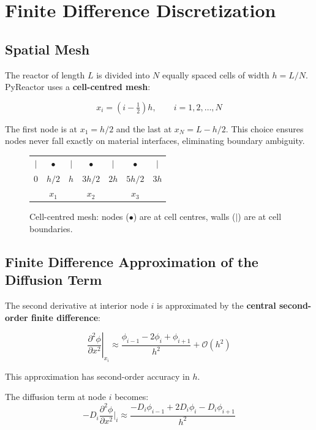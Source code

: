\documentclass[12pt,a4paper]{article}
\newcommand{\pdd}[2]{\frac{\partial^2 #1}{\partial #2^2}}
\begin{document}
\section{Finite Difference Discretization}

\subsection{Spatial Mesh}

The reactor of length $L$ is divided into $N$ equally spaced cells
of width $h = L/N$. PyReactor uses a \textbf{cell-centred mesh}:

\begin{equation}
  x_i = \left(i - \tfrac{1}{2}\right)h, \qquad i = 1, 2, \ldots, N
\end{equation}

The first node is at $x_1 = h/2$ and the last at $x_N = L - h/2$.
This choice ensures nodes never fall exactly on material interfaces,
eliminating boundary ambiguity.

\begin{figure}[h!]
\centering
\begin{tabular}{ccccccc}
  $|$ & $\bullet$ & $|$ & $\bullet$ & $|$ & $\bullet$ & $|$ \\
  $0$ & $h/2$ & $h$ & $3h/2$ & $2h$ & $5h/2$ & $3h$ \\
      & $x_1$ &     & $x_2$ &      & $x_3$  &
\end{tabular}
\caption{Cell-centred mesh: nodes ($\bullet$) are at cell centres,
         walls ($|$) are at cell boundaries.}
\end{figure}

\subsection{Finite Difference Approximation of the Diffusion Term}

The second derivative at interior node $i$ is approximated by the
\textbf{central second-order finite difference}:

\begin{equation}
  \left.\pdd{\phi}{x}\right|_{x_i}
  \approx \frac{\phi_{i-1} - 2\phi_i + \phi_{i+1}}{h^2}
  + \mathcal{O}(h^2)
  \label{eq:fd}
\end{equation}

This approximation has second-order accuracy in $h$.

The diffusion term at node $i$ becomes:
\begin{equation}
  -D_i\pdd{\phi}{x}\bigg|_i
  \approx \frac{-D_i\phi_{i-1} + 2D_i\phi_i - D_i\phi_{i+1}}{h^2}
\end{equation}
\end{document}
